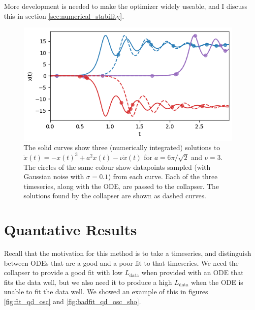 \documentclass{article}
\begin{document}
More development is needed to make the optimizer widely useable, and I discuss this in section \ref{sec:numerical_stability}.

\begin{figure}
\includegraphics{images/results/double_well_collapser.png}
\centering
\caption{
The solid curves show three (numerically integrated) solutions to $\ddot{x}(t) = -x(t)^3 + a^2 x(t) - \nu \dot{x}(t)$ for $a = 6\pi / \sqrt{2}$ and $\nu = 3$.
The circles of the same colour show datapoints sampled (with Gaussian noise with $\sigma = 0.1$) from each curve.
Each of the three timeseries, along with the ODE, are passed to the collapser.
The solutions found by the collapser are shown as dashed curves.
}
\label{fig:double_well_collapser}
\end{figure}

\section{Quantative Results}
\label{sec:quant_results}

Recall that the motivation for this method is to take a timeseries, and distinguish between ODEs that are a good and a poor fit to that timeseries.
We need the collapser to provide a good fit with low $L_{\mathrm{data}}$ when provided with an ODE that fits the data well, but we also need it to produce a high $L_{\mathrm{data}}$ when the ODE is unable to fit the data well.
We showed an example of this in figures \ref{fig:fit_qd_osc} and \ref{fig:badfit_qd_osc_sho}.
\end{document}
